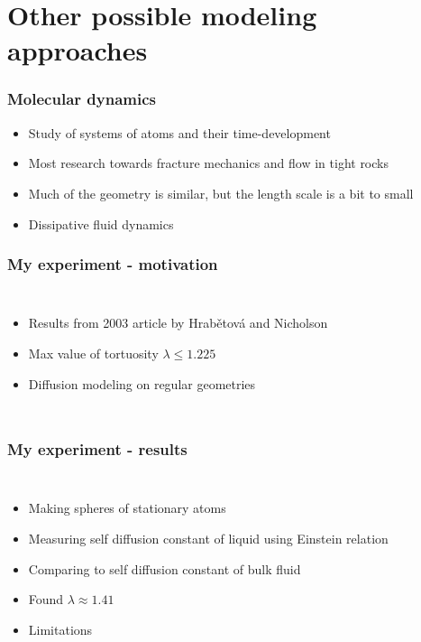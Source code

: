 \documentclass{beamer}
\begin{document}
\section{Other possible modeling approaches}
\begin{frame}
 \frametitle{Molecular dynamics}
 \begin{itemize}
  \item Study of systems of atoms and their time-development
  \item Most research towards fracture mechanics and flow in tight rocks
  \item Much of the geometry is similar, but the length scale is a bit to small
  \item Dissipative fluid dynamics
 \end{itemize}
 
\end{frame}

\begin{frame}
 \frametitle{My experiment - motivation}
 \begin{columns}
  \column{2.0in}
  \begin{itemize}
   \item Results from 2003 article by Hrab\v{e}tov\'{a} and Nicholson
   \item Max value of tortuosity $\lambda \leq 1.225$
   \item Diffusion modeling on regular geometries
  \end{itemize}
\column{2.0in}

 \end{columns}

\end{frame}

\begin{frame}
 \frametitle{My experiment - results}
 \begin{columns}
  \column{2.0in}
  \begin{itemize}
   \item Making spheres of stationary atoms
   \item Measuring self diffusion constant of liquid using Einstein relation
   \item Comparing to self diffusion constant of bulk fluid
   \item Found $\lambda \approx 1.41$
   \item Limitations
  \end{itemize}
\column{2.0in}

 \end{columns}

\end{frame}
\end{document}
